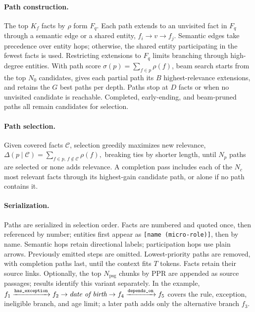 \documentclass[sigconf, review, anonymous]{acmart}
\begin{document}
\paragraph{Path construction.}
The top $K_f$ facts by $\rho$ form $F_q$. Each path extends to an unvisited fact in $F_q$ through a semantic edge or a shared entity, $f_i\rightarrow v\rightarrow f_j$. Semantic edges take precedence over entity hops; otherwise, the shared entity participating in the fewest facts is used. Restricting extensions to $F_q$ limits branching through high-degree entities. With path score $\sigma(p)=\sum_{f\in p}\rho(f)$, beam search starts from the top $N_0$ candidates, gives each partial path its $B$ highest-relevance extensions, and retains the $G$ best paths per depth. Paths stop at $D$ facts or when no unvisited candidate is reachable. Completed, early-ending, and beam-pruned paths all remain candidates for selection.

\paragraph{Path selection.}
Given covered facts $\mathcal{C}$, selection greedily maximizes new relevance,
$\Delta(p\mid\mathcal{C})=\sum_{f\in p,\,f\notin\mathcal{C}}\rho(f), $
breaking ties by shorter length, until $N_p$ paths are selected or none adds relevance. A completion pass includes each of the $N_c$ most relevant facts through its highest-gain candidate path, or alone if no path contains it. 

\paragraph{Serialization.}
Paths are serialized in selection order. Facts are numbered and quoted once, then referenced by number; entities first appear as \texttt{[name (micro-role)]}, then by name. Semantic hops retain directional labels; participation hops use plain arrows. Previously emitted steps are omitted. Lowest-priority paths are removed, with completion paths last, until the context fits $T$ tokens. Facts retain their source links. Optionally, the top $N_{\mathrm{psg}}$ chunks by PPR are appended as source passages; results identify this variant separately. In the example,
$f_1\xrightarrow{\texttt{has\_exception}}f_2\rightarrow\emph{date of birth}
\rightarrow f_4\xrightarrow{\texttt{depends\_on}}f_5$
covers the rule, exception, ineligible branch, and age limit; a later path adds only the alternative branch $f_3$.
\end{document}
